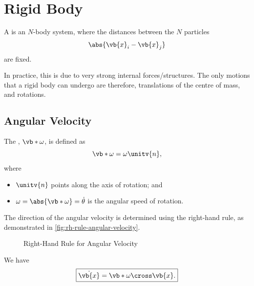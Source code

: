 \section{Rigid Body}

\begin{definition}
    \label{def:rigid-body}%
    A  is an \(N\)-body system, where the distances between the \(N\) particles
    \begin{equation}
        \abs{\vb{x}_i - \vb{x}_j}
    \end{equation}
    are fixed.
\end{definition}

In practice, this is due to very strong internal forces/structures. The only motions that a rigid body can undergo are therefore, translations of the centre of mass, and rotations.

\subsection{Angular Velocity}

\begin{definition}
    \label{def:angular-velocity}%
    The , \(\vb*{\omega}\), is defined as
    \begin{equation}
        \vb*{\omega} = \omega \unitv{n},
    \end{equation}
    where
    \begin{itemize}
        \item \(\unitv{n}\) points along the axis of rotation; and
        \item \(\omega = \abs{\vb*{\omega}} = \dot{\theta}\) is the angular speed of rotation.
    \end{itemize}
\end{definition}

The direction of the angular velocity is determined using the right-hand rule, as demonstrated in \autoref{fig:rh-rule-angular-velocity}.

\begin{figure}[ht!]
    \centering
    \caption{Right-Hand Rule for Angular Velocity}
    \label{fig:rh-rule-angular-velocity}%
\end{figure}

\begin{lemma}
    \label{lem:cross-product-velocity-angular-velocity}%
    We have
    \begin{equation}
        \boxed{\dot{\vb{x}} = \vb*{\omega} \cross \vb{x}.}
    \end{equation}
\end{lemma}

